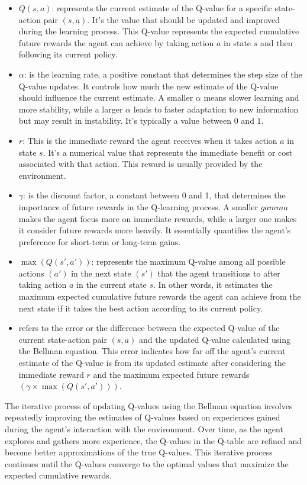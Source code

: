 \documentclass{article}
\begin{document}
 \begin{itemize}
     \item $Q(s, a)$: represents the current estimate of the Q-value for a specific state-action pair $(s, a)$. It's the value that should be updated and improved during the learning process. This Q-value represents the expected cumulative future rewards the agent can achieve by taking action $a$ in state $s$ and then following its current policy.
     \item $\alpha$: is the learning rate, a positive constant that determines the step size of the Q-value updates. It controls how much the new estimate of the Q-value should influence the current estimate. A smaller $\alpha$ means slower learning and more stability, while a larger $\alpha$ leads to faster adaptation to new information but may result in instability. It's typically a value between $0$ and $1$.
     \item $r$: This is the immediate reward the agent receives when it takes action $a$ in state $s$. It's a numerical value that represents the immediate benefit or cost associated with that action. This reward is usually provided by the environment.
     \item $\gamma$: is the discount factor, a constant between 0 and 1, that determines the importance of future rewards in the Q-learning process. A smaller $gamma$ makes the agent focus more on immediate rewards, while a larger one makes it consider future rewards more heavily. It essentially quantifies the agent's preference for short-term or long-term gains.
     \item $\max(Q(s', a'))$: represents the maximum Q-value among all possible actions $(a')$ in the next state $(s')$ that the agent transitions to after taking action $a$ in the current state $s$. In other words, it estimates the maximum expected cumulative future rewards the agent can achieve from the next state if it takes the best action according to its current policy.
     \item refers to the error or the difference between the expected Q-value of the current state-action pair $(s, a)$ and the updated Q-value calculated using the Bellman equation. This error indicates how far off the agent's current estimate of the Q-value is from its updated estimate after considering the immediate reward $r$ and the maximum expected future rewards $(\gamma \times \max(Q(s', a')))$.
 \end{itemize}

The iterative process of updating Q-values using the Bellman equation involves repeatedly improving the estimates of Q-values based on experiences gained during the agent's interaction with the environment. Over time, as the agent explores and gathers more experience, the Q-values in the Q-table are refined and become better approximations of the true Q-values. This iterative process continues until the Q-values converge to the optimal values that maximize the expected cumulative rewards.
\end{document}
